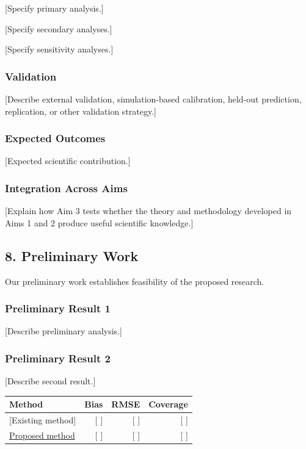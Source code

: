 \documentclass[
  11pt,
  letterpaper,
]{article}
\begin{document}
{[}Specify primary analysis.{]}

{[}Specify secondary analyses.{]}

{[}Specify sensitivity analyses.{]}

\subsubsection{Validation}\label{validation}

{[}Describe external validation, simulation-based calibration, held-out
prediction, replication, or other validation strategy.{]}

\subsubsection{Expected Outcomes}\label{expected-outcomes-2}

{[}Expected scientific contribution.{]}

\subsubsection{Integration Across Aims}\label{integration-across-aims}

{[}Explain how Aim 3 tests whether the theory and methodology developed
in Aims 1 and 2 produce useful scientific knowledge.{]}

\subsection{8. Preliminary Work}\label{preliminary-work}

Our preliminary work establishes feasibility of the proposed research.

\subsubsection{Preliminary Result 1}\label{preliminary-result-1}

{[}Describe preliminary analysis.{]}

\subsubsection{Preliminary Result 2}\label{preliminary-result-2}

{[}Describe second result.{]}

\begin{longtable}[]{@{}lrrr@{}}
\toprule\noalign{}
Method & Bias & RMSE & Coverage \\
\midrule\noalign{}
\endhead
\bottomrule\noalign{}
\endlastfoot
{[}Existing method{]} & {[} {]} & {[} {]} & {[} {]} \\
\hyperref[proposed-method]{Proposed method} & {[} {]} & {[} {]} & {[}
{]} \\
\end{longtable}
\end{document}
